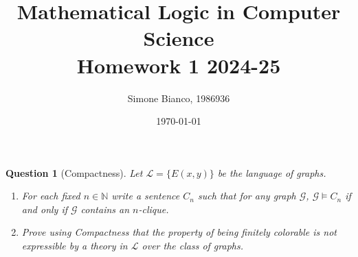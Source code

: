 \documentclass[12pt,a4paper]{report}
\newtheorem{question}{Question}
\theoremstyle{definition}
\newcommand{\N}{\mathbb{N}}         %
\begin{document}
    \setlength{\parskip}{5pt}               %
    \setlength{\parindent}{0pt}             %

    \title{Mathematical Logic in Computer Science \\ Homework 1 2024-25}
    \author{Simone Bianco, 1986936}
    \date{\today}

    \maketitle

    \begin{question}[Compactness]
        Let $\mathcal{L} = \{E(x, y)\}$ be the language of graphs.
        \begin{enumerate}
            \item For each fixed $n \in \N$ write a sentence $C_n$ such that for any graph $\mathcal{G}$, $\mathcal{G} \models C_n$ if and only if $\mathcal{G}$ contains an $n$-clique.
            \item Prove using Compactness that the property of being finitely colorable is not expressible by a theory in $\mathcal{L}$ over the class of graphs.
        \end{enumerate}
    \end{question}
\end{document}
